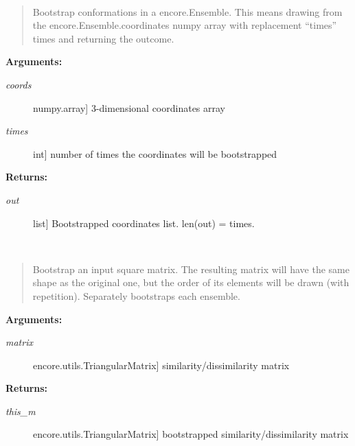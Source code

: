 \documentclass[letterpaper,10pt,english]{sphinxmanual}
\begin{document}
\begin{fulllineitems}
\label{index:encore.similarity.bootstrap_coordinates}~\begin{quote}

Bootstrap conformations in a encore.Ensemble. This means drawing from the encore.Ensemble.coordinates numpy array with replacement ``times'' times and returning the outcome.
\end{quote}

\textbf{Arguments:}
\begin{description}
\item[{\emph{coords}}] \leavevmode{[}numpy.array{]}
3-dimensional coordinates array

\item[{\emph{times}}] \leavevmode{[}int{]}
number of times the coordinates will be bootstrapped

\end{description}

\textbf{Returns:}
\begin{description}
\item[{\emph{out}}] \leavevmode{[}list{]}
Bootstrapped coordinates list. len(out) = times.

\end{description}

\end{fulllineitems}


\begin{fulllineitems}
\label{index:encore.similarity.bootstrap_matrix}~\begin{quote}

Bootstrap an input square matrix. The resulting matrix will have the same shape as the original one, but the order of its elements will be drawn (with repetition). Separately bootstraps each ensemble.
\end{quote}

\textbf{Arguments:}
\begin{description}
\item[{\emph{matrix}}] \leavevmode{[}encore.utils.TriangularMatrix{]}
similarity/dissimilarity matrix

\end{description}

\textbf{Returns:}
\begin{description}
\item[{\emph{this\_m}}] \leavevmode{[}encore.utils.TriangularMatrix{]}
bootstrapped similarity/dissimilarity matrix

\end{description}

\end{fulllineitems}
\end{document}
